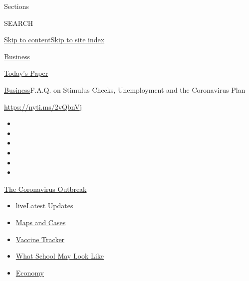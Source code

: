 Sections

SEARCH

\protect\hyperlink{site-content}{Skip to
content}\protect\hyperlink{site-index}{Skip to site index}

\href{https://www.nytimes.com/section/business}{Business}

\href{https://myaccount.nytimes.com/auth/login?response_type=cookie\&client_id=vi}{}

\href{https://www.nytimes.com/section/todayspaper}{Today's Paper}

\href{/section/business}{Business}\textbar{}F.A.Q. on Stimulus Checks,
Unemployment and the Coronavirus Plan

\url{https://nyti.ms/2vQbnVj}

\begin{itemize}
\item
\item
\item
\item
\item
\item
\end{itemize}

\href{https://www.nytimes.com/news-event/coronavirus?action=click\&pgtype=Article\&state=default\&region=TOP_BANNER\&context=storylines_menu}{The
Coronavirus Outbreak}

\begin{itemize}
\tightlist
\item
  live\href{https://www.nytimes.com/2020/08/01/world/coronavirus-covid-19.html?action=click\&pgtype=Article\&state=default\&region=TOP_BANNER\&context=storylines_menu}{Latest
  Updates}
\item
  \href{https://www.nytimes.com/interactive/2020/us/coronavirus-us-cases.html?action=click\&pgtype=Article\&state=default\&region=TOP_BANNER\&context=storylines_menu}{Maps
  and Cases}
\item
  \href{https://www.nytimes.com/interactive/2020/science/coronavirus-vaccine-tracker.html?action=click\&pgtype=Article\&state=default\&region=TOP_BANNER\&context=storylines_menu}{Vaccine
  Tracker}
\item
  \href{https://www.nytimes.com/interactive/2020/07/29/us/schools-reopening-coronavirus.html?action=click\&pgtype=Article\&state=default\&region=TOP_BANNER\&context=storylines_menu}{What
  School May Look Like}
\item
  \href{https://www.nytimes.com/live/2020/07/31/business/stock-market-today-coronavirus?action=click\&pgtype=Article\&state=default\&region=TOP_BANNER\&context=storylines_menu}{Economy}
\end{itemize}

